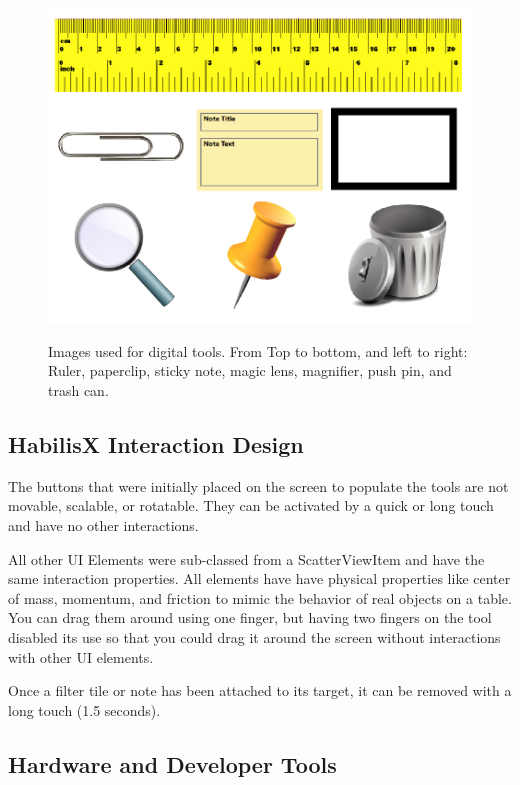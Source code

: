 \documentclass{article}
\begin{document}
\begin{figure}[t]
\centering
\scalebox{.623}
{\includegraphics{ToolsFigure.png}}
\caption{Images used for digital tools.  From Top to bottom, and left to right: Ruler, paperclip, sticky note, magic lens, magnifier, push pin, and trash can.}  
\end{figure} 


\subsection{HabilisX Interaction Design}
The buttons that were initially placed on the screen to populate the tools are not movable, scalable, or rotatable.  They can be activated by a quick or long touch and have no other interactions.  

All other UI Elements were sub-classed from a ScatterViewItem and have the same interaction properties.  All elements have have physical properties like center of mass, momentum, and friction to mimic the behavior of real objects on a table.  You can drag them around using one finger, but having two fingers on the tool disabled its use so that you could drag it around the screen without interactions with other UI elements.  

Once a filter tile or note has been attached to its target, it can be removed with a long touch (1.5 seconds).  

\subsection{Hardware and Developer Tools}
\end{document}
